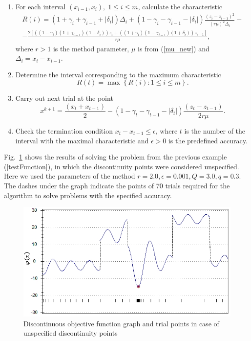 \documentclass[runningheads]{llncs}
\begin{document}
\begin{enumerate}
\item For each interval $(x_{i-1},x_i), \; 1 \leq i \leq m$, calculate the characteristic
\[
\begin{gathered}
R(i)=(1+\gamma_i+\gamma_{i-1}+|\delta_i |) \Delta_i+(1-\gamma_i-\gamma_{i-1}-|\delta_i |)\frac{(z_i-z_{i-1} )^2}{(r\mu)^2 \Delta_i } - \\
- \frac{2[((1-\gamma_i )(1+\gamma_{i-1} )(1-\delta_i )) z_i+((1+\gamma_i )(1-\gamma_{i-1} )(1+\delta_i )) z_{i-1} ]}{r\mu},
\end{gathered}
\]
where $r > 1$ is the method parameter, $\mu$ is from (\ref{mu_new}) and $\Delta_i=x_i-x_{i-1}$.

\item Determine the interval corresponding to the maximum characteristic
\[
R(t)=\max\left\{R(i): 1 \leq i \leq m\right\}.
\]

\item Carry out next trial at the point 
\begin{equation}\label{new_x_2}
x^{k+1}=\frac {(x_t+x_{t-1})}{2}-(1-\gamma_t-\gamma_{t-1}- |\delta_t|) \frac{(z_t-z_{t-1})}{2r\mu}.
\end{equation}

\item Check the termination condition $x_t-x_{t-1} \leq \epsilon$, where $t$ is the number of the interval with the maximal characteristic and $\epsilon > 0$ is the predefined accuracy.
\end{enumerate}

Fig.~\ref{ris2} shows the results of solving the problem from the previous example (\ref{testFunction}), in which the discontinuity points were considered unspecified. Here we used the parameters of the method $r=2.0, \epsilon=0.001, Q=3.0, q=0.3$. The dashes under the graph indicate the points of 70 trials required for the algorithm to solve problems with the specified accuracy.

\begin{figure}%
	\begin{center}
			\includegraphics[width=0.9\linewidth]{ris_2.jpg}
			\caption{Discontinuous objective function graph and trial points in case of unspecified discontinuity points}
      \label{ris2}
	\end{center}
\end{figure}
\end{document}
